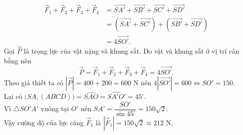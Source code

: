 \begin{bt}
{\begin{align*}
			\overrightarrow{F}_1 + \overrightarrow{F}_2 + \overrightarrow{F}_3 + \overrightarrow{F}_4 & = \overrightarrow{SA'} + \overrightarrow{SB'} + \overrightarrow{SC'} + \overrightarrow{SD'}                           \\
			                                                                                          & = \left(\overrightarrow{SA'} + \overrightarrow{SC'}\right) + \left(\overrightarrow{SB'} + \overrightarrow{SD'}\right) \\
			                                                                                          & =4\overrightarrow{SO'}.
		\end{align*}
		Gọi $\overrightarrow{P}$ là trọng lực của vật nặng và khung sắt. Do vật và khung sắt ở vị trí cân bằng nên
		\[\overrightarrow{P} = \overrightarrow{F}_1 + \overrightarrow{F}_2 + \overrightarrow{F}_3 + \overrightarrow{F}_4 = 4\overrightarrow{SO'}.\]
		Theo giả thiết ta có $\left|\overrightarrow{P}\right|=400+200=600$ N nên $4\left|\overrightarrow{SO'}\right| =600 \Leftrightarrow SO'=150$.\\
		Lại có $\bigl(SA,(ABCD)\bigr)=\widehat{SAO}=\widehat{SA'O'}=45^\circ$.\\
		Vì $\triangle SO'A'$ vuông tại $O'$ nên $SA'=\dfrac{SO'}{\sin 45^{\circ}}=150\sqrt{2}$.\\
		Vậy cường độ của lực căng $\overrightarrow{F}_1$ là $\left|\overrightarrow{F}_1\right| = 150\sqrt{2}\approx 212$ N.
	}
\end{bt}

